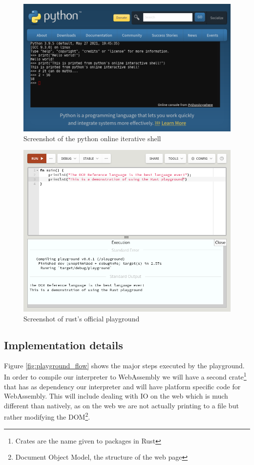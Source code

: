 \documentclass{article}
\begin{document}
\begin{figure}
	\includegraphics[width=\textwidth]{python-playground}
	\caption{Screenshot of the python online iterative shell}
	\label{fig:python-playground}
\end{figure}

\begin{figure}
	\includegraphics[width=\textwidth]{rust-playground}
	\caption{Screenshot of rust's official playground}
	\label{fig:rust-playground}
\end{figure}

\subsection{Implementation details}

Figure \ref{fig:playground_flow} shows the major steps executed by the
playground. In order to compile our interpreter to WebAssembly we will have a
second crate\footnote{Crates are the name given to packages in Rust} that has
as dependency our interpreter and will have platform specific code for
WebAssembly. This will include dealing with IO on the web which is much
different than natively, as on the web we are not actually printing to a file
but rather modifying the DOM\footnote{Document Object Model, the structure of
the web page}.
\end{document}
